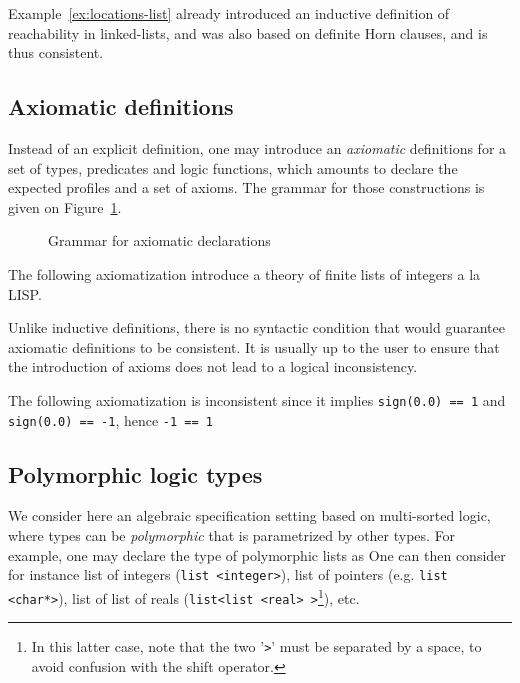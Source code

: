 Example~\ref{ex:locations-list} already introduced an inductive definition of
reachability in linked-lists, and was also based on definite Horn
clauses, and is thus consistent.

\subsection{Axiomatic definitions}

Instead of an explicit definition, one may introduce an
\emph{axiomatic} definitions for a set of types, predicates and logic
functions, which amounts to declare the expected profiles and a set of
axioms. The grammar for those constructions is given on
Figure~\ref{fig:gram:logicdecl}.

\begin{figure}[t]
  \begin{cadre} 
    \end{cadre}
  \caption{Grammar for axiomatic declarations}
\label{fig:gram:logicdecl}
\end{figure}

\begin{example}
  The following axiomatization introduce a theory of finite lists of
  integers a la LISP.
\end{example}

Unlike inductive definitions, there is no syntactic condition that
would guarantee axiomatic definitions to be consistent. It is usually
up to the user to ensure that the introduction of axioms does not lead
to a logical inconsistency.

\begin{example}
  The following axiomatization
  is inconsistent since
  it implies \lstinline|sign(0.0) == 1| and \lstinline|sign(0.0) == -1|,
  hence \lstinline|-1 == 1|
\end{example}

\subsection{Polymorphic logic types}\label{sec:polym-logic-types}

We consider here an algebraic specification setting based on
multi-sorted logic, where types can be \emph{polymorphic} that is
parametrized by other types. For example, one may declare the type of
polymorphic lists as
One can then consider for
instance list of integers (\lstinline|list <integer>|), list of pointers
(e.g. \lstinline|list <char*>|), list of list of reals
(\lstinline|list<list <real> >|\footnote{In this latter case, note that the two
  '\texttt{>}' must be separated by a space, to avoid confusion with
  the shift operator.}), etc.


